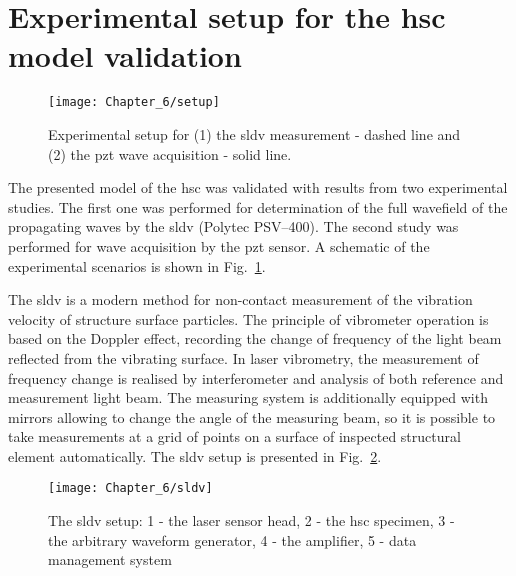\section{Experimental setup for the \acs{hsc} model validation}
\label{sec:setup}
\begin{figure}
	\begin{center}
		\texttt{[image: Chapter\_6/setup]}
	\end{center}
	\caption{Experimental setup for (1) the \acf{sldv} measurement - dashed line and (2) the \acf{pzt} wave acquisition - solid line.}
	\label{fig:setup}
\end{figure}
The presented model of the \ac{hsc} was validated with results from two experimental studies.
The first one was performed for determination of the full wavefield of the propagating waves by the \ac{sldv} (Polytec PSV–400).
The second study was performed for wave acquisition by the \ac{pzt} sensor.
A schematic of the experimental scenarios is shown in Fig.~\ref{fig:setup}.

The \ac{sldv} is a modern method for non-contact measurement of the vibration velocity of structure surface particles.
The principle of vibrometer operation is based on the Doppler effect, recording the change of frequency of the light beam reflected from the vibrating surface.
In laser vibrometry, the measurement of frequency change is realised by interferometer and analysis of both reference and measurement light beam.
The measuring system is additionally equipped with mirrors allowing to change the angle of the measuring beam, so it is possible to take measurements at a grid of points on a surface of inspected structural element automatically.
The \ac{sldv} setup is presented in Fig.~\ref{fig:sldv}.
\begin{figure}
	\begin{center}
		\texttt{[image: Chapter\_6/sldv]}
	\end{center}
	\caption{The \acf{sldv} setup: 1 - the laser sensor head, 2 - the \acf{hsc} specimen, 3 - the arbitrary waveform generator, 4 - the amplifier, 5 - data management system}
	\label{fig:sldv}
\end{figure}

